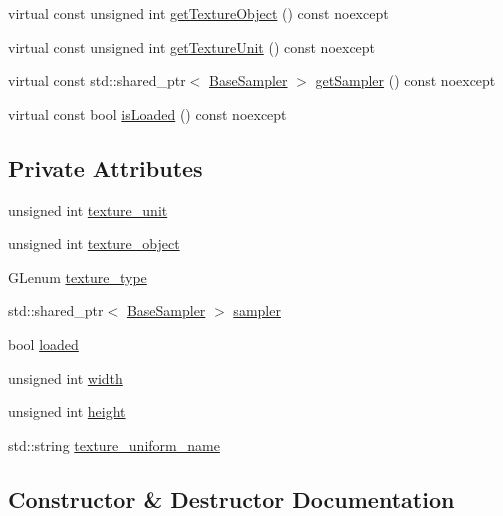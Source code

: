 \begin{DoxyCompactItemize}
\item 
virtual const unsigned int \hyperlink{class_graphics_1_1_base_texture_a41bde844f513682641852da44f2f36a0}{get\+Texture\+Object} () const noexcept
\item 
virtual const unsigned int \hyperlink{class_graphics_1_1_base_texture_aaed0ad8a0ec7cc99943786aeebc2f3aa}{get\+Texture\+Unit} () const noexcept
\item 
virtual const std\+::shared\+\_\+ptr$<$ \hyperlink{class_graphics_1_1_base_sampler}{Base\+Sampler} $>$ \hyperlink{class_graphics_1_1_base_texture_a2ec731186e9afd266bc052aead7b15e8}{get\+Sampler} () const noexcept
\item 
virtual const bool \hyperlink{class_graphics_1_1_base_texture_a41e628cfd60b58269b088bc8538515bb}{is\+Loaded} () const noexcept
\end{DoxyCompactItemize}
\subsection*{Private Attributes}
\begin{DoxyCompactItemize}
\item 
unsigned int \hyperlink{class_graphics_1_1_base_texture_a30d08898d1d01c9960061dc2c8a98091}{texture\+\_\+unit}
\item 
unsigned int \hyperlink{class_graphics_1_1_base_texture_a2303afbe9f67a54922741d2c946b105f}{texture\+\_\+object}
\item 
G\+Lenum \hyperlink{class_graphics_1_1_base_texture_a8541c8b38644380478955b823792b4d6}{texture\+\_\+type}
\item 
std\+::shared\+\_\+ptr$<$ \hyperlink{class_graphics_1_1_base_sampler}{Base\+Sampler} $>$ \hyperlink{class_graphics_1_1_base_texture_a7232ffaf919587d39516dcbd3f2659bd}{sampler}
\item 
bool \hyperlink{class_graphics_1_1_base_texture_a1765fd6190e0a14c93f173e8693d07b2}{loaded}
\item 
unsigned int \hyperlink{class_graphics_1_1_base_texture_ad2790b49e5eab93516a8097c8f9dd422}{width}
\item 
unsigned int \hyperlink{class_graphics_1_1_base_texture_a8790d792749a6d25d18753880451baf8}{height}
\item 
std\+::string \hyperlink{class_graphics_1_1_base_texture_a00bca25b10d3fe76e3f415606d302074}{texture\+\_\+uniform\+\_\+name}
\end{DoxyCompactItemize}


\subsection{Constructor \& Destructor Documentation}
\hypertarget{class_graphics_1_1_base_texture_ae44fed159354650aee7f3e6f5d0b6477}{}

